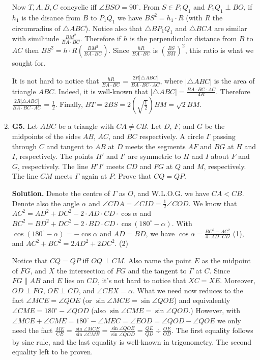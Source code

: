 \documentclass[11pt,a4paper]{article}
\begin{document}
\begin{enumerate}
Now $T, A, B, C$ concyclic iff $\angle BSO=90^{\circ}$. From $S\in P_1Q_1$ and $P_1Q_1\perp BO$, if $h_1$ is the disance from $B$ to $P_1Q_1$ we have $BS^2=h_1\cdot R$ (with $R$ the circumradius of $\triangle ABC$). Notice also that $\triangle BP_1Q_1$ and $\triangle BCA$ are similar with similitude $\frac{BM^2}{BA\cdot BC}$. Therefore if $h$ is the perpendicular distance from $B$ to $AC$ then $BS^2=h\cdot R(\frac{BM^2}{BA\cdot BC})$. Since $\frac{hR}{BA\cdot BC}$ is $\left (\frac{BS}{BM}\right )^2$, this ratio is what we sought for.

It is not hard to notice that $\frac{hR}{BA\cdot BC}$ = $\frac{2R|\triangle ABC|}{BA\cdot BC\cdot AC}$, where $|\triangle ABC|$ is the area of triangle $ABC$. Indeed, it is well-known that $|\triangle ABC|=\frac{BA\cdot BC\cdot AC}{4R}.$ Therefore $\frac{2R|\triangle ABC|}{BA\cdot BC\cdot AC}$ =  $\frac12$. Finally, $BT=2BS=2\left(\sqrt{\frac12}\right)BM=\sqrt2 BM.$

\item\textbf{G5.} Let $ABC$ be a triangle with $CA \neq CB$. Let $D$, $F$, and $G$ be the midpoints of the sides $AB$, $AC$, and $BC$ respectively. A circle $\Gamma$ passing through $C$ and tangent to $AB$ at $D$ meets the segments $AF$ and $BG$ at $H$ and $I$, respectively. The points $H'$ and $I'$ are symmetric to $H$ and $I$ about $F$ and $G$, respectively. The line $H'I'$ meets $CD$ and $FG$ at $Q$ and $M$, respectively. The line $CM$ meets $\Gamma$ again at $P$. Prove that $CQ = QP$.

\textbf{Solution.} Denote the centre of $\Gamma$ as $O$, and W.L.O.G. we have $CA<CB$. Denote also the angle $\alpha$ and $\angle CDA=\angle CID=\frac{1}{2}\angle COD$. We know that $AC^2= AD^2+DC^2-2\cdot AD\cdot CD\cdot\cos\alpha$ and $BC^2= BD^2+DC^2-2\cdot BD\cdot CD\cdot\cos(180^{\circ}-\alpha)$. With $\cos(180^{\circ}-\alpha)=-\cos\alpha$ and $AD=BD$, we have $\cos\alpha=\frac{BC^2-AC^2}{4\cdot AD\cdot CD}$ (1), and $AC^2+BC^2=2AD^2+2DC^2$. (2)

Notice that $CQ=QP$ iff $OQ\perp CM$. Also name the point $E$ as the midpoint of $FG$, and $X$ the intersection of $FG$ and the tangent to $\Gamma$ at $C$. Since $FG\parallel AB$ and $E$ lies on $CD$, it's not hard to notice that $XC=XE$. Moreover, $OD\perp FG$, $OE\perp CD$, and $\angle CEX=\alpha$. What we need now reduces to the fact $\angle MCE=\angle QOE$ (or $\sin\angle MCE=\sin\angle QOE$) and equivalently $\angle CME=180^{\circ}-\angle QOD$ (also $\sin\angle CME=\sin\angle QOD$.) However, with $\angle MCE+\angle CME=180^{\circ}-\angle MEC=\angle EOD=\angle QOD-\angle QOE$ we only need the fact $\frac{ME}{CE}=\frac {\sin\angle MCE}{\sin\angle CME}=\frac {\sin\angle QOE}{\sin\angle QOD}=\frac {QE}{QD}\div \frac{OE}{OD}.$ The first equality follows by sine rule, and the last equality is well-known in trigonometry. The second equality left to be proven.


\end{enumerate}
\end{document}
